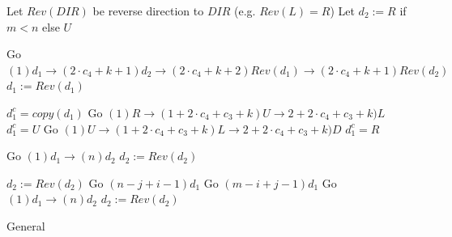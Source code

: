 \documentclass[a4paper,11pt]{article}
\theoremstyle{definition}
\newcommand{\ltr}{{{\sf{LTR}}}\xspace}
\begin{document}
\begin{algorithm}
\begin{algorithmic}
    
        
            
    
    
    \STATE Let $Rev(DIR)$ be reverse direction to $DIR$ (e.g. $Rev(L)=R$)
    \STATE Let $d_2 := R$ if $m<n$ else $U$
    
        \STATE Go ${(1) d_1} \to {(2\cdot c_4+k+1) d_2} \to {(2\cdot c_4+k+2) Rev(d_1)} \to {(2\cdot c_4+k+1) Rev(d_2)}$ 
        \STATE $d_1 := Rev(d_1)$
    \ENDFOR
    
    \STATE $d_1^c=copy(d_1)$
            \STATE Go ${(1) R} \to (1+2\cdot c_4 + c_3+k) U \to 2+2\cdot c_4 + c_3+k)L$
            \STATE $d_1^c=U$
        \ELSE
            \STATE Go ${(1) U} \to (1+2\cdot c_4 + c_3+k) L \to 2+2\cdot c_4 + c_3+k)D$
            \STATE $d_1^c=R$
        \ENDIF
    \ENDFOR
    
            \STATE Go $(1)d_1 \to (n) d_2$
            \STATE $d_2 := Rev(d_2)$
        \ENDFOR
        
        \STATE $d_2 := Rev(d_2)$
            \STATE Go $(n-j+i-1) d_1$ %
            \STATE Go $(m-i+j-1) d_1$ %
        \ENDIF
    \ENDIF
            \STATE Go $(1) d_1 \to (n) d_2$
            \STATE $d_2 := Rev(d_2)$
        \ENDFOR
    \ENDIF
    
    
    
    
    \end{algorithmic}
    \caption{General \ltr}
    \label{algorithms: generalized ltr}
\end{algorithm}
\end{document}
